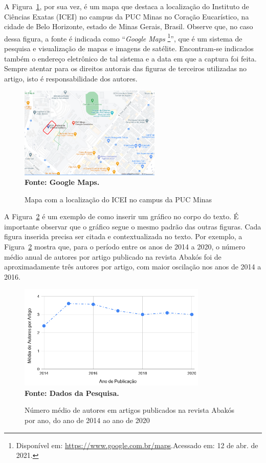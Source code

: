 \documentclass[a4paper,12pt]{article}
\begin{document}
A Figura~\ref{fig:figura2}, por sua vez, é um mapa que destaca a localização do Instituto de Ciências Exatas (ICEI) no campus da PUC Minas no Coração Eucarístico, na cidade de Belo Horizonte, estado de Minas Gerais, Brasil. Observe que, no caso dessa figura, a fonte é indicada como “{\it Google Maps}	\footnote{Disponível em: \url{https://www.google.com.br/maps}.Acessado em: 12 de abr. de 2021.}”, que é um sistema de pesquisa e visualização de mapas e imagens de satélite. Encontram-se indicados também o endereço eletrônico de tal sistema e a data em que a captura foi feita. Sempre atentar para os direitos autorais das figuras de terceiros utilizadas no artigo, isto é responsabilidade dos autores.

\begin{figure}[ht]
	\centering	
	\caption[Mapa com a localização do ICEI.]{Mapa com a localização do ICEI no campus da PUC Minas}
	\label{fig:figura2}
	\includegraphics[width=0.6\textwidth]{figuras/Mapa-ICEI-PUCMinas.png}\\
	\textbf{\footnotesize Fonte: Google Maps.}
\end{figure}

A Figura~\ref{fig:figura3} é um exemplo de como inserir um gráfico no corpo do texto. É importante observar que o gráfico segue o mesmo padrão das outras figuras. Cada figura inserida precisa ser citada e contextualizada no texto. Por exemplo, a Figura~\ref{fig:figura3} mostra que, para o período entre os anos de 2014 a 2020, o número médio anual de autores por artigo publicado na revista Abakós foi de aproximadamente três autores por artigo, com maior oscilação nos anos de 2014 a 2016.

\begin{figure}[ht]
	\centering	
	\caption[Média de Autores por Artigo.]{Número médio de autores em artigos publicados na revista Abakós por ano, do ano de 2014 ao ano de 2020}
	\label{fig:figura3}
	\includegraphics[width=0.8\textwidth]{figuras/AutoresPorArtigoNaRevistaAbakos.png}\\
	\textbf{\footnotesize Fonte: Dados da Pesquisa.}
\end{figure}
\end{document}
